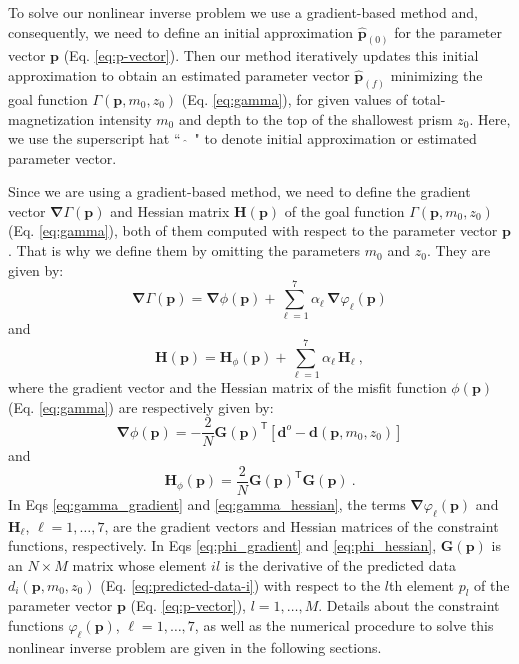 To solve our nonlinear inverse problem we use a gradient-based method and,
consequently, we need to define an initial approximation $\hat{\mathbf{p}}_{(0)}$ 
for the parameter vector $ \mathbf{p} $ (Eq. \ref{eq:p-vector}). 
Then our method iteratively updates this initial approximation to obtain 
an estimated parameter vector $\hat{\mathbf{p}}_{(f)}$ minimizing the goal function
$\Gamma (\mathbf{p}, m_{0}, z_{0})$ (Eq. \ref{eq:gamma}),
for given values of total-magnetization intensity $m_{0}$ and depth to the top
of the shallowest prism $z_{0}$. 
Here, we use the superscript hat ``~$\hat{}$~" to denote initial approximation or
estimated parameter vector.

Since we are using a gradient-based method, we need to define the 
gradient vector $\boldsymbol{\nabla}\Gamma(\mathbf{p})$ and Hessian matrix 
$\mathbf{H}(\mathbf{p})$ of the goal function $\Gamma(\mathbf{p}, m_{0}, z_{0})$ 
(Eq. \ref{eq:gamma}), both of them computed with respect to the parameter vector
$\mathbf{p}$. That is why we define them by omitting the parameters $m_{0}$ and
$z_{0}$. They are given by:
\begin{equation}\label{eq:gamma_gradient}
\boldsymbol{\nabla}\Gamma (\mathbf{p}) = \boldsymbol{\nabla}\phi (\mathbf{p}) + 
\sum\limits^{7}_{\ell =1} \alpha_{\ell} \, \boldsymbol{\nabla}\varphi_{\ell}(\mathbf{p})
\end{equation}
and
\begin{equation}\label{eq:gamma_hessian}
\mathbf{H} (\mathbf{p}) = \mathbf{H}_\phi (\mathbf{p}) + \sum\limits^{7}_{\ell =1} \alpha_{\ell} \, \mathbf{H}_\ell \: ,
\end{equation}
where the gradient vector and the Hessian matrix of the misfit function 
$\phi(\mathbf{p})$ (Eq. \ref{eq:gamma}) are respectively given by:
\begin{equation}\label{eq:phi_gradient}
\boldsymbol{\nabla} \phi(\mathbf{p}) = - \frac{2}{N}\mathbf{G}(\mathbf{p})^{\mathsf{T}}[\mathbf{d}^o - 
\mathbf{d}(\mathbf{p}, m_{0}, z_{0})]
\end{equation} 
and 
\begin{equation}\label{eq:phi_hessian}
\mathbf{H}_{\phi}(\mathbf{p}) = \frac{2}{N}\mathbf{G}(\mathbf{p})^{\mathsf{T}}\mathbf{G}(\mathbf{p}) \: .
\end{equation}
In Eqs \ref{eq:gamma_gradient} and \ref{eq:gamma_hessian}, the terms 
$\boldsymbol{\nabla} \varphi_{\ell}(\mathbf{p})$ and $\mathbf{H}_{\ell}$, 
$\ell = 1, \dots, 7$, are the gradient vectors and Hessian matrices of the constraint functions, respectively. In Eqs \ref{eq:phi_gradient} and \ref{eq:phi_hessian},
$\mathbf{G}(\mathbf{p})$ is an $N \times M$ matrix whose element $il$ is the derivative of the predicted data $d_{i}(\mathbf{p}, m_{0}, z_{0})$ (Eq. \ref{eq:predicted-data-i}) with respect to the $l$th element $p_{l}$ of 
the parameter vector $\mathbf{p}$ (Eq. \ref{eq:p-vector}), $l = 1, \dots, M$.
Details about the constraint functions $\varphi_\ell(\mathbf{p})$, $\ell = 1, \dots, 7$, as well as the numerical procedure to solve this nonlinear inverse problem are given in the following sections.

